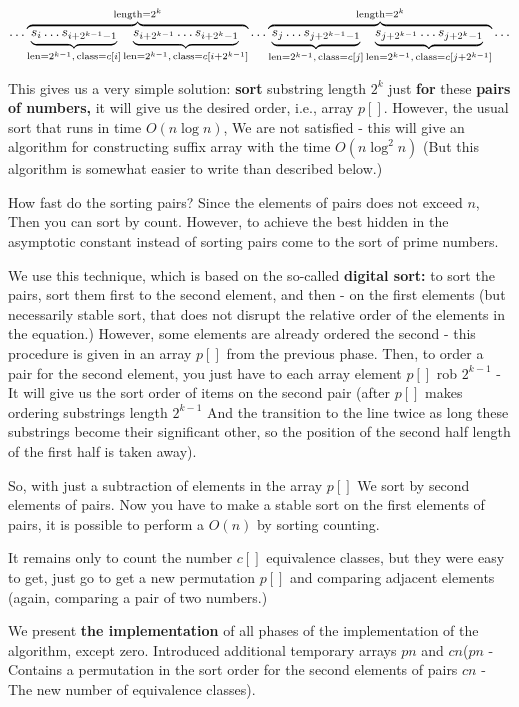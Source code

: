 $\ldots\overbrace{\underbrace{s_{i}\ldots s_{i+2^{k-1}-1}}_{{\rm len}=2^{k-1},\,{\rm class}=c[i]}\underbrace{s_{i+2^{k-1}}\ldots s_{i+2^{k}-1}}_{{\rm len}=2^{k-1},\,{\rm class}=c[i+2^{k-1}]}}^{{\rm length}=2^{k}}\ldots\overbrace{\underbrace{s_{j}\ldots s_{j+2^{k-1}-1}}_{{\rm len}=2^{k-1},\,{\rm class}=c[j]}\underbrace{s_{j+2^{k-1}}\ldots s_{j+2^{k}-1}}_{{\rm len}=2^{k-1},\,{\rm class}=c[j+2^{k-1}]}}^{{\rm length}=2^{k}}\ldots$

This gives us a very simple solution: \textbf{sort} substring length $2 ^ k$ just \textbf{for} these \textbf{pairs of numbers,} it will give us the desired order, i.e., array $p []$. However, the usual sort that runs in time $O (n \log n)$, We are not satisfied - this will give an algorithm for constructing suffix array with the time $O (n \log ^ 2 n)$ (But this algorithm is somewhat easier to write than described below.)

How fast do the sorting pairs? Since the elements of pairs does not exceed $n$, Then you can sort by count. However, to achieve the best hidden in the asymptotic constant instead of sorting pairs come to the sort of prime numbers.

We use this technique, which is based on the so-called \textbf{digital sort:} to sort the pairs, sort them first to the second element, and then - on the first elements (but necessarily stable sort, that does not disrupt the relative order of the elements in the equation.) However, some elements are already ordered the second - this procedure is given in an array $p []$ from the previous phase. Then, to order a pair for the second element, you just have to each array element $p []$ rob $2 ^ {k-1}$ - It will give us the sort order of items on the second pair (after $p []$ makes ordering substrings length $2 ^ {k-1}$ And the transition to the line twice as long these substrings become their significant other, so the position of the second half length of the first half is taken away).

So, with just a subtraction of elements in the array $p []$ We sort by second elements of pairs. Now you have to make a stable sort on the first elements of pairs, it is possible to perform a $O (n)$ by sorting counting.

It remains only to count the number $c []$ equivalence classes, but they were easy to get, just go to get a new permutation $p []$ and comparing adjacent elements (again, comparing a pair of two numbers.)

We present \textbf{the implementation} of all phases of the implementation of the algorithm, except zero. Introduced additional temporary arrays $pn$ and $cn$($pn$ - Contains a permutation in the sort order for the second elements of pairs $cn$ - The new number of equivalence classes).


